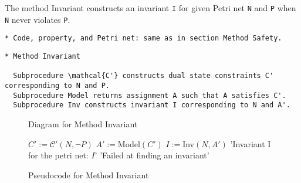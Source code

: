 \documentclass{llncs}
\begin{document}
The method Invariant constructs an invariant \verb=I= for given Petri net \verb=N= and \verb=P= when \verb=N= never violates \verb=P=.

\begin{verbatim}
* Code, property, and Petri net: same as in section Method Safety.
\end{verbatim}

\begin{verbatim}
* Method Invariant

  Subprocedure \mathcal{C'} constructs dual state constraints C' corresponding to N and P.
  Subprocedure Model returns assignment A such that A satisfies C'.
  Subprocedure Inv constructs invariant I corresponding to N and A'.
\end{verbatim}

\begin{figure}
\begin{center}
\end{center}
\caption{Diagram for Method Invariant}
\label{fig:method-invariant-diagram}
\end{figure}

\begin{figure}
\begin{algorithmic}[1]
\State $C' := \mathcal C'(N, \neg P)$
  \State $A' := $Model$(C')$
  \State $I := $Inv$(N, A')$
  \State \Return 'Invariant I for the petri net: $I$'
\Else
  \State \Return 'Failed at finding an invariant'
\EndIf
\end{algorithmic}
\caption{Pseudocode for Method Invariant}
\label{fig:method-invariant-pseudocode}
\end{figure}
\end{document}
